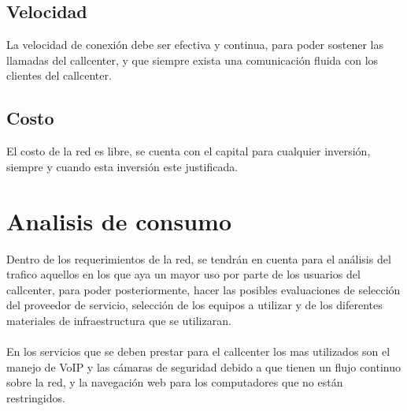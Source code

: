 \documentclass[12pt]{article}
\begin{document}
\subsection{\textbf{Velocidad}}
La velocidad de conexión debe ser efectiva y continua, para poder sostener las llamadas del callcenter, y que siempre exista una comunicación fluida con los clientes del callcenter.

\subsection{\textbf{Costo}}
El costo de la red es libre, se cuenta con el capital para cualquier inversión, siempre y cuando esta inversión este justificada.

\pagebreak
\section{\textbf{Analisis de consumo}}
Dentro de los requerimientos de la red, se tendrán en cuenta para el análisis del trafico aquellos en los que aya un mayor uso por parte de los usuarios del callcenter, para poder posteriormente, hacer las posibles evaluaciones de selección del proveedor de servicio, selección de los equipos a utilizar y de los diferentes materiales de infraestructura que se utilizaran.\\\\
En los servicios que se deben prestar para el callcenter los mas utilizados son el manejo de VoIP y las cámaras de seguridad debido a que tienen un flujo continuo sobre la red, y la navegación web para los computadores que no están restringidos.\\\\
\end{document}
